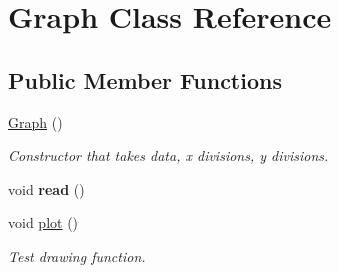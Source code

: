 \hypertarget{classGraph}{
\section{Graph Class Reference}
\label{classGraph}
}
\subsection*{Public Member Functions}
\begin{DoxyCompactItemize}
\item 
\hypertarget{classGraph_ae4c72b8ac4d693c49800a4c7e273654f}{
\hyperlink{classGraph_ae4c72b8ac4d693c49800a4c7e273654f}{Graph} ()}
\label{classGraph_ae4c72b8ac4d693c49800a4c7e273654f}

\begin{DoxyCompactList}\small\item\em Constructor that takes data, x divisions, y divisions. \item\end{DoxyCompactList}\item 
\hypertarget{classGraph_a5fd7fa94430834cd76ad756cf1c68457}{
void {\bfseries read} ()}
\label{classGraph_a5fd7fa94430834cd76ad756cf1c68457}

\item 
\hypertarget{classGraph_a397e6e5732512984591030d633971ba5}{
void \hyperlink{classGraph_a397e6e5732512984591030d633971ba5}{plot} ()}
\label{classGraph_a397e6e5732512984591030d633971ba5}

\begin{DoxyCompactList}\small\item\em Test drawing function. \item\end{DoxyCompactList}\end{DoxyCompactItemize}

